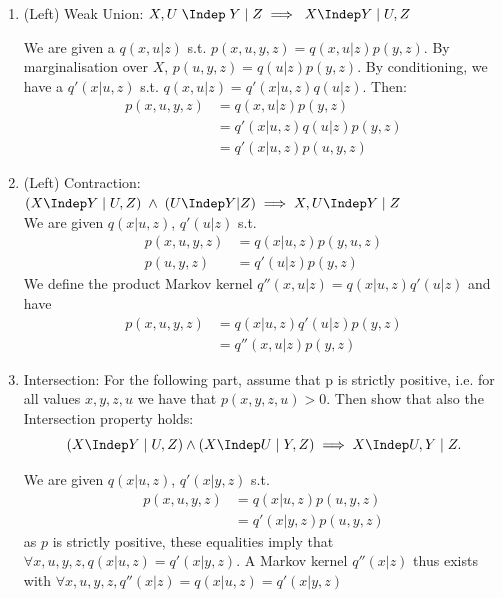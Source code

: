 \begin{enumerate}[label=4.\arabic*]
\begin{ungradedsolution}
\begin{enumerate}
            \item (Left) Weak Union: $X,U \;\Indep \;  Y \; | \; Z \implies  \; X \Indep Y \; |\; U,Z $

            We are given a $q(x,u|z)$ s.t. $p(x, u, y, z)=q(x, u|z)p(y, z)$. By marginalisation over $X$, $p(u, y, z)=q(u|z)p(y, z)$. By conditioning, we have a $q'(x|u,z)$ s.t. $q(x,u|z)=q'(x|u,z)q(u|z)$. Then:
            \begin{align*}
                p(x,u,y,z)
                 & =q(x,u|z)p(y,z)        \\
                 & =q'(x|u,z)q(u|z)p(y,z) \\
                 & =q'(x|u,z)p(u,y,z)
            \end{align*}

            \item (Left) Contraction: $(X \Indep Y\; |\; U, Z) \; \land \; (U \Indep Y | Z) \implies X, U \Indep Y \; | \; Z$ \\

            We are given $q(x|u,z)$, $q'(u|z)$ s.t.
            \begin{align*}
                p(x, u, y, z) & =q(x|u,z)p(y, u, z) \\
                p(u, y, z)    & =q'(u|z)p(y, z)
            \end{align*}
            We define the product Markov kernel $q''(x,u|z)=q(x|u,z)q'(u|z)$ and have
            \begin{align*}
                p(x, u, y, z) & =q(x|u,z)q'(u|z)p(y, z) \\
                              & =q''(x,u|z)p(y, z)
            \end{align*}

            \item Intersection: For the following part, assume that p is strictly positive, i.e. for all values $x,y,z,u$ we have that $p(x, y, z, u) > 0$. Then show that also the Intersection property holds:
            $$(X \Indep Y \;|\;U,Z) \land (X \Indep U \; | \; Y,Z)  \implies  X \Indep U,Y \; | \; Z.$$

            We are given $q(x|u,z)$, $q'(x|y,z)$ s.t.
            \begin{align*}
                p(x, u, y, z) & =q(x|u,z)p(u, y, z) \\
                              & =q'(x|y,z)p(u,y, z)
            \end{align*}
            as $p$ is strictly positive, these equalities imply that $\forall x, u, y, z, q(x|u,z)=q'(x|y,z)$. A Markov kernel $q''(x|z)$ thus exists with $\forall x,u,y,z, q''(x|z)=q(x|u,z)=q'(x|y,z)$
        \end{enumerate}
    \end{ungradedsolution}


\end{enumerate}
